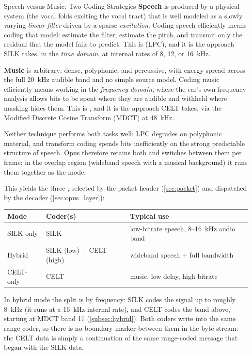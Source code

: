 \begin{concept}{Speech versus Music: Two Coding Strategies}
  \textbf{Speech} is produced by a physical system (the vocal folds exciting
  the vocal tract) that is well modeled as a slowly varying \emph{linear
  filter} driven by a sparse \emph{excitation}. Coding speech efficiently means
  coding that model: estimate the filter, estimate the pitch, and transmit only
  the residual that the model fails to predict. This is
   (LPC), and it is the approach SILK takes, in the \emph{time
  domain}, at
  internal rates of 8, 12, or 16~kHz.

  \textbf{Music} is arbitrary: dense, polyphonic, and percussive, with energy
  spread across the full 20~kHz audible band and no simple source model. Coding
  music efficiently means working in the \emph{frequency domain}, where the
  ear's own frequency analysis allows bits to be spent where they are audible
  and withheld where masking hides them. This is , and
  it is the approach CELT takes, via the Modified Discrete Cosine Transform
  (MDCT) at 48~kHz.

  Neither technique performs both tasks well: LPC degrades on polyphonic
  material, and transform coding spends bits inefficiently on the strong
  predictable structure of speech. Opus therefore retains both and switches
  between them per frame; in the overlap region (wideband speech with a musical
  background) it runs them together as the  mode.
\end{concept}

This yields the three , selected by the packet header
(\cref{sec:packet}) and dispatched by the decoder (\cref{sec:opus_layer}):

\begin{center}
  \begin{tabular}{lll}
    \toprule
    \textbf{Mode} & \textbf{Coder(s)} & \textbf{Typical use} \\
    \midrule
    SILK-only & SILK & low-bitrate speech, 8--16~kHz audio band \\
    Hybrid    & SILK (low) + CELT (high) & wideband speech + full bandwidth \\
    CELT-only & CELT & music, low delay, high bitrate \\
    \bottomrule
  \end{tabular}
\end{center}

In hybrid mode the split is by frequency: SILK codes the signal up to roughly
8~kHz (it runs at a 16~kHz internal rate), and CELT codes the band above,
starting at MDCT band 17 (\cref{subsec:hybrid}). Both coders write into the same
range coder, so there is no boundary marker between them in the byte stream: the
CELT data is simply a continuation of the same range-coded message that began
with the SILK data.

